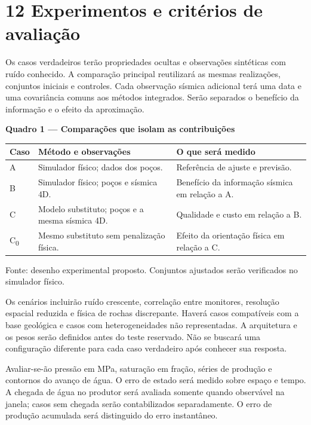\documentclass[12pt,a4paper]{article}
\begin{document}
\section*{12 Experimentos e critérios de avaliação}
Os casos verdadeiros terão propriedades ocultas e observações sintéticas com ruído conhecido. A comparação principal reutilizará as mesmas realizações, conjuntos iniciais e controles. Cada observação sísmica adicional terá uma data e uma covariância comuns aos métodos integrados. Serão separados o benefício da informação e o efeito da aproximação.\par
\noindent\textbf{\small Quadro 1 --- Comparações que isolam as contribuições}\par
\begin{center}\small\renewcommand{\arraystretch}{1.2}\begin{tabularx}{\linewidth}{|p{1.2cm}|>{\raggedright\arraybackslash}X|>{\raggedright\arraybackslash}X|}\hline
\textbf{Caso} & \textbf{Método e observações} & \textbf{O que será medido}\\\hline
A & Simulador físico; dados dos poços. & Referência de ajuste e previsão.\\\hline
B & Simulador físico; poços e sísmica 4D. & Benefício da informação sísmica em relação a A.\\\hline
C & Modelo substituto; poços e a mesma sísmica 4D. & Qualidade e custo em relação a B.\\\hline
C\textsubscript{0} & Mesmo substituto sem penalização física. & Efeito da orientação física em relação a C.\\\hline
\end{tabularx}\end{center}
{\noindent\small Fonte: desenho experimental proposto. Conjuntos ajustados serão verificados no simulador físico.\par}
Os cenários incluirão ruído crescente, correlação entre monitores, resolução espacial reduzida e física de rochas discrepante. Haverá casos compatíveis com a base geológica e casos com heterogeneidades não representadas. A arquitetura e os pesos serão definidos antes do teste reservado. Não se buscará uma configuração diferente para cada caso verdadeiro após conhecer sua resposta.\par
Avaliar-se-ão pressão em MPa, saturação em fração, séries de produção e contornos do avanço de água. O erro de estado será medido sobre espaço e tempo. A chegada de água no produtor será avaliada somente quando observável na janela; casos sem chegada serão contabilizados separadamente. O erro de produção acumulada será distinguido do erro instantâneo.\par
\end{document}
